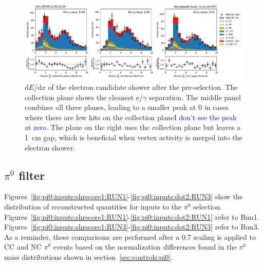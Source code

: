 \documentclass[a4paper]{article}
\begin{document}
\begin{figure}
    \centering
    \includegraphics[width=\textwidth]{NueCCsel/Images/run1/e_cand_dedx.pdf}
    \caption{d$E$/d$x$ of the electron candidate shower after the pre-selection. The collection plane shows the cleanest e/$\gamma$ separation. The middle panel combines all three planes, leading to a smaller peak at 0 in cases where there are few hits on the collection plane\textcolor{blue}{I don't see the peak at zero}. The plane on the right uses the collection plane but leaves a \SI{1}{\cm} gap, which is beneficial when vertex activity is merged into the electron shower.}
    \label{fig:e_cand_dedx}
\end{figure}

\subsection{$\pi^0$ filter}
\par Figures~\ref{fig:pi0:inputs:shrscore1:RUN1}-\ref{fig:pi0:inputs:dot2:RUN3} show the distribution of reconstructed quantities for inputs to the $\pi^0$ selection. Figures~\ref{fig:pi0:inputs:shrscore1:RUN1}-\ref{fig:pi0:inputs:dot2:RUN1} refer to Run1. Figures~\ref{fig:pi0:inputs:shrscore1:RUN3}-\ref{fig:pi0:inputs:dot2:RUN3} refer to Run3. As a reminder, these comparisons are performed after a 0.7 scaling is applied to CC and NC $\pi^0$ events based on the normalization differences found in the $\pi^0$ mass distributions shown in section~\ref{sec:controls:pi0}.
\end{document}
